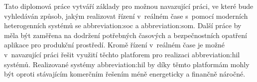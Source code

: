 \documentclass[a4paper, twoside, 11pt]{article}
\begin{document}
Tato diplomová práce vytváří základy pro možnou navazující práci, ve které bude vyhledáván způsob, jakým realizovat řízení v~reálném čase s~pomocí moderních heterogenních systémů se \gls{abbreviation:soc} a \gls{abbreviation:som}. Další práce by měla být zaměřena na dodržení potřebných časových a bezpečnostních opatření aplikace pro produkční prostředí. Kromě řízení v~reálném čase je možné v~navazující práci řešit využití těchto platforem pro realizaci \gls{abbreviation:hil} systémů. Realizované systémy \gls{abbreviation:hil} by díky těmto platformám mohly být oproti stávajícím komerčním řešením méně energeticky a finančně náročné.
\par
	

\flushbottom %


\newpage
\setmonofont{Times New Roman}
\printbibliography[title={{Literatura}}]	
\nocite{*}
\setmonofont{Courier}
	\appendix
\end{document}
